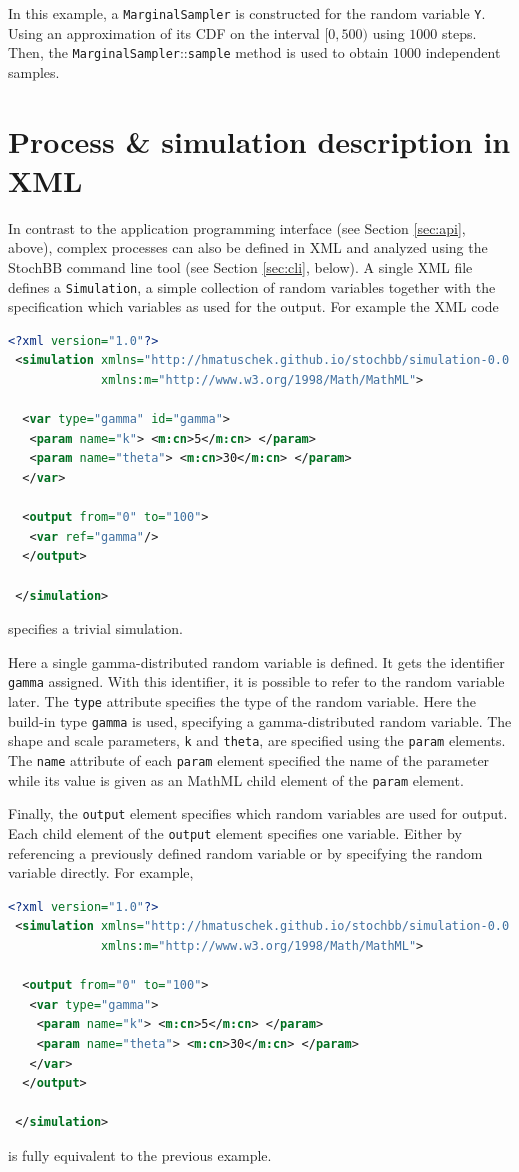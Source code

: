 \documentclass[a4paper, 10pt]{paper}
\newcommand{\code}[1]{\texttt{#1}}
\newcommand{\class}[1]{\code{#1}}
\newcommand{\method}[2]{\code{#1}::\code{#2}}
\begin{document}
In this example, a \class{MarginalSampler} is constructed for the random variable \code{Y}. Using an
approximation of its CDF on the interval $[0,500)$ using $1000$ steps. Then, the
\method{MarginalSampler}{sample} method is used to obtain $1000$ independent samples.


\section{Process \& simulation description in XML} \label{sec:xml}
In contrast to the application programming interface (see Section \ref{sec:api}, above), 
complex processes can also be defined in XML and analyzed using the
StochBB command line tool (see Section \ref{sec:cli}, below). A single XML file defines a 
\class{Simulation}, a simple collection of random variables together with the specification which
variables as used for the output. For example the XML code
\begin{lstlisting}[language=XML]
 <?xml version="1.0"?>
 <simulation xmlns="http://hmatuschek.github.io/stochbb/simulation-0.0.dtd"
             xmlns:m="http://www.w3.org/1998/Math/MathML">

  <var type="gamma" id="gamma">
   <param name="k"> <m:cn>5</m:cn> </param>
   <param name="theta"> <m:cn>30</m:cn> </param>
  </var>

  <output from="0" to="100">
   <var ref="gamma"/>
  </output>

 </simulation>
\end{lstlisting}
specifies a trivial simulation.

Here a single gamma-distributed random variable is defined.
It gets the identifier \code{gamma} assigned. With this identifier, it is possible to refer to the random
variable later. The \code{type} attribute specifies the type of the random variable. Here the
build-in type \code{gamma} is used, specifying a gamma-distributed random variable. The shape and
scale parameters, \code{k} and \code{theta}, are specified using the \code{param} elements. 
The \code{name} attribute of each \code{param} element specified the name of the parameter while 
its value is given as an MathML child element of the \code{param} element.

Finally, the \code{output} element specifies which random variables are used for output. Each child
element of the \code{output} element specifies one variable. Either by referencing a previously defined
random variable or by specifying the random variable directly. For example,
\begin{lstlisting}[language=XML]
 <?xml version="1.0"?>
 <simulation xmlns="http://hmatuschek.github.io/stochbb/simulation-0.0.dtd"
             xmlns:m="http://www.w3.org/1998/Math/MathML">

  <output from="0" to="100">
   <var type="gamma">
    <param name="k"> <m:cn>5</m:cn> </param>
    <param name="theta"> <m:cn>30</m:cn> </param>
   </var>
  </output>

 </simulation>
\end{lstlisting}
is fully equivalent to the previous example.
\end{document}

